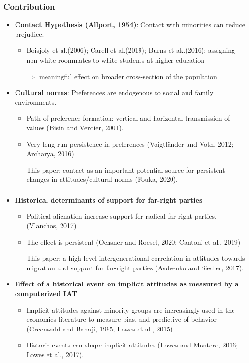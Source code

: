 \documentclass[dvipdfmx,11pt]{beamer}
\begin{document}
\begin{frame}\frametitle{Contribution}
  \begin{itemize}
    \item \textbf{Contact Hypothesis (Allport, 1954)}: Contact with minorities can reduce prejudice.
    \begin{itemize}
      \item Boisjoly et al.(2006); Carell et al.(2019); Burns et ak.(2016): assigning non-white roommates to white students at higher education

      $\Rightarrow$ meaningful effect on broader cross-section of the population.
    \end{itemize}
    \item \textbf{Cultural norms}: Preferences are endogenous to social and family environments.
    \begin{itemize}
      \item Path of preference formation: vertical and horizontal transmission of values (Bisin and Verdier, 2001).
      \item Very long-run persistence in preferences (Voigtl\"{a}nder and Voth, 2012; Archarya, 2016)

      This paper: contact as an important potential source for persistent changes in attitudes/cultural norms (Fouka, 2020).
    \end{itemize}
  \end{itemize}
\end{frame}

\begin{frame}\frametitle{}
  \begin{itemize}
    \item \textbf{Historical determinants of support for far-right parties}
    \begin{itemize}
      \item Political alienation increase support for radical far-right parties.(Vlanchos, 2017)
      \item The effect is persistent (Ochsner and Roesel, 2020; Cantoni et al., 2019)

      This paper: a high level intergenerational correlation in attitudes towards migration and support for far-right parties (Avdeenko and Siedler, 2017).
    \end{itemize}
    \item \textbf{Effect of a historical event on implicit attitudes as measured by a computerized IAT}
    \begin{itemize}
      \item Implicit attitudes against minority groups are increasingly used in the economics literature to measure bias, and predictive of behavior (Greenwald and Banaji, 1995; Lowes et al., 2015).
      \item Historic events can shape implicit attitudes (Lowes and Montero, 2016; Lowes et al., 2017).
    \end{itemize}
  \end{itemize}
\end{frame}
\end{document}
